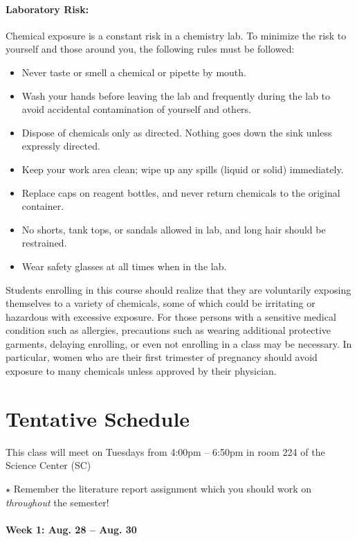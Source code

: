 \documentclass[12pt, letterpaper]{article}
\begin{document}
\paragraph{Laboratory Risk:}
Chemical exposure is a constant risk in a chemistry lab. To minimize the risk to yourself and those around you, the following rules must be followed:
\begin{itemize}
	\item Never taste or smell a chemical or pipette by mouth.
	\item Wash your hands before leaving the lab and frequently during the lab to avoid accidental contamination of yourself and others.
	\item Dispose of chemicals only as directed. Nothing goes down the sink unless expressly directed.
	\item Keep your work area clean; wipe up any spills (liquid or solid) immediately.
	\item Replace caps on reagent bottles, and never return chemicals to the original container.
	\item No shorts, tank tops, or sandals allowed in lab, and long hair should be restrained.
	\item Wear safety glasses at all times when in the lab.
\end{itemize}
Students enrolling in this course should realize that they are voluntarily exposing themselves to a variety of chemicals, some of which could be irritating or hazardous with excessive exposure.  For those persons with a sensitive medical condition such as allergies, precautions such as wearing additional protective garments, delaying enrolling, or even not enrolling in a class may be necessary.  In particular, women who are their first trimester of pregnancy should avoid exposure to many chemicals unless approved by their physician.

\section*{Tentative Schedule}
This class will meet on Tuesdays from 4:00pm -- 6:50pm in room 224 of the Science Center (SC)

\noindent
$\star$ Remember the literature report assignment which you should work on \emph{throughout} the semester!

\paragraph{Week 1: Aug. 28 -- Aug. 30}~
\end{document}
